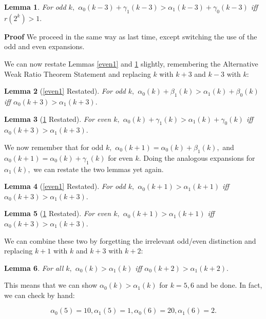 \documentclass{article}
\newtheorem{lemma}{Lemma}[section]
\begin{document}
\begin{lemma}
\label{odd1}
For odd $k,$ $\alpha_0(k-3) + \gamma_1(k-3) > \alpha_1(k-3) + \gamma_0(k-3)$ \emph{iff} $r(2^k) > 1.$
\end{lemma}

\textbf{Proof} We proceed in the same way as last time, except switching the use of the odd and even expansions.

We can now restate Lemmas \ref{even1} and \ref{odd1} slightly, remembering the Alternative Weak Ratio Theorem Statement and replacing $k$ with $k+3$ and $k-3$ with $k:$

\begin{lemma}[\ref{even1} Restated]
\label{even2}
For odd $k,$ $\alpha_0(k) + \beta_1(k) > \alpha_1(k) + \beta_0(k)$ \emph{iff} $\alpha_0(k+3) > \alpha_1(k+3).$
\end{lemma}

\begin{lemma}[\ref{odd1} Restated]
\label{odd2}
For even $k,$ $\alpha_0(k) + \gamma_1(k) > \alpha_1(k) + \gamma_0(k)$ \emph{iff} $\alpha_0(k+3) > \alpha_1(k+3).$
\end{lemma}

We now remember that for odd $k,$ $\alpha_0(k+1) = \alpha_0(k) + \beta_1(k),$ and $\alpha_0(k+1) = \alpha_0(k) + \gamma_1(k)$ for even $k.$ Doing the analogous expansions for $\alpha_1(k),$ we can restate the two lemmas yet again.

\begin{lemma}[\ref{even1} Restated]
\label{even3}
For odd $k,$ $\alpha_0(k+1) > \alpha_1(k+1)$ \emph{iff} $\alpha_0(k+3) > \alpha_1(k+3).$
\end{lemma}

\begin{lemma}[\ref{odd1} Restated]
\label{odd3}
For even $k,$ $\alpha_0(k+1) > \alpha_1(k+1)$ \emph{iff} $\alpha_0(k+3) > \alpha_1(k+3).$
\end{lemma}

We can combine these two by forgetting the irrelevant odd/even distinction and replacing $k+1$ with $k$ and $k+3$ with $k+2:$

\begin{lemma}
\label{jump2}
For all $k,$ $\alpha_0(k) > \alpha_1(k)$ \emph{iff} $\alpha_0(k+2) > \alpha_1(k+2).$
\end{lemma}

This means that we can show $\alpha_0(k) > \alpha_1(k)$ for $k = 5, 6$ and be done. In fact, we can check by hand:

$$\alpha_0(5) = 10, \alpha_1(5) = 1, \alpha_0(6) = 20, \alpha_1(6) = 2.$$
\end{document}
